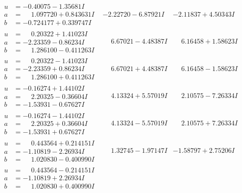\documentclass[1p]{elsarticle_modified}
\theoremstyle{definition}
\begin{document}
$$\begin{array}{c|c|c}
\begin{aligned}
u &= -0.40075 - 1.35681 I \\
a &= \phantom{-}1.097720 + 0.843631 I \\
b &= -0.724177 + 0.339747 I\end{aligned}
 & -2.22720 - 6.87921 I & -2.11837 + 4.50343 I \\ \hline\begin{aligned}
u &= \phantom{-}0.20322 + 1.41023 I \\
a &= -2.23359 - 0.86234 I \\
b &= \phantom{-}1.286100 - 0.411263 I\end{aligned}
 & \phantom{-}6.67021 - 4.48387 I & \phantom{-}6.16458 + 1.58623 I \\ \hline\begin{aligned}
u &= \phantom{-}0.20322 - 1.41023 I \\
a &= -2.23359 + 0.86234 I \\
b &= \phantom{-}1.286100 + 0.411263 I\end{aligned}
 & \phantom{-}6.67021 + 4.48387 I & \phantom{-}6.16458 - 1.58623 I \\ \hline\begin{aligned}
u &= -0.16274 + 1.44102 I \\
a &= \phantom{-}2.20325 - 0.36604 I \\
b &= -1.53931 - 0.67627 I\end{aligned}
 & \phantom{-}4.13324 + 5.57019 I & \phantom{-}2.10575 - 7.26334 I \\ \hline\begin{aligned}
u &= -0.16274 - 1.44102 I \\
a &= \phantom{-}2.20325 + 0.36604 I \\
b &= -1.53931 + 0.67627 I\end{aligned}
 & \phantom{-}4.13324 - 5.57019 I & \phantom{-}2.10575 + 7.26334 I \\ \hline\begin{aligned}
u &= \phantom{-}0.443564 + 0.214151 I \\
a &= -1.10819 - 2.26934 I \\
b &= \phantom{-}1.020830 - 0.400990 I\end{aligned}
 & \phantom{-}1.32745 - 1.97147 I & -1.58797 + 2.75206 I \\ \hline\begin{aligned}
u &= \phantom{-}0.443564 - 0.214151 I \\
a &= -1.10819 + 2.26934 I \\
b &= \phantom{-}1.020830 + 0.400990 I\end{aligned}

\end{array}$$
\end{document}
